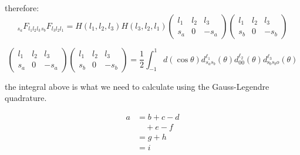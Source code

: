 \documentclass[11pt]{article}
\begin{document}
therefore:
\begin{equation}
_{s_{a}} F_{l_{1} l_{2} l_{3}}{_{s_{b}} F_{l_{3} l_{2} l_{1}}}=H(l_{1},l_{2},l_{3})H(l_{3},l_{2},l_{1}){\left( \begin{array}{ccc}{l_{1}} & {l_{2}} & {l_{3}} \\ {s_{a} } & {0} & {-s_{a}}\end{array}\right)}{\left( \begin{array}{ccc}{l_{1}} & {l_{2}} & {l_{3}} \\ {s_{b} } & {0} & {-s_{b}}\end{array}\right)}
\end{equation}


\begin{equation}
{\left( \begin{array}{ccc}{l_{1}} & {l_{2}} & {l_{3}} \\ {s_{a} } & {0} & {-s_{a}}\end{array}\right)}{\left( \begin{array}{ccc}{l_{1}} & {l_{2}} & {l_{3}} \\ {s_{b} } & {0} & {-s_{b}}\end{array}\right)}=\frac{1}{2}\int_{-1}^{1} d(\cos \theta) d_{s_{a} s_{b}}^{\ell_{1}}(\theta) d_{0 0}^{\ell_{2}}(\theta) d_{\mathrm{s}_{b} s_{b}o}^{\ell_{3}}(\theta)
\end{equation}

the integral above is what we need to calculate using the Gauss-Legendre quadrature.





\begin{equation}
\begin{split}
a& =b+c-d\\
 & \quad +e-f\\
 & =g+h\\
 & =i
\end{split}
\end{equation}
\end{document}
